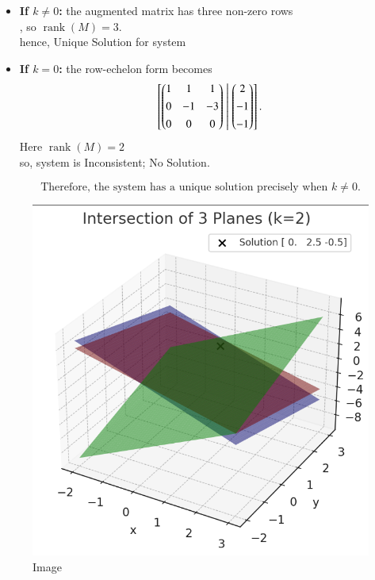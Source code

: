 \documentclass[journal]{IEEEtran}
\begin{document}
\begin{itemize}
\item \textbf{If \(k\neq0\):} the augmented matrix has three non-zero rows\\, so \(\operatorname{rank}(M)=3\).\\ 
hence, Unique Solution for system
\item \textbf{If \(k=0\):} the row-echelon form becomes
\[
\left[\begin{pmatrix}1 & 1 & 1\\[4pt] 0 & -1 & -3\\[4pt] 0 & 0 & 0\end{pmatrix}\;\middle|\;\begin{pmatrix}2\\[4pt]-1\\[4pt]-1\end{pmatrix}\right].
\]
Here \(\operatorname{rank}(M)=2\)\\
so, system is Inconsistent; No Solution.
\end{itemize}

\[
\boxed{\text{Therefore, the system has a unique solution precisely when }k\neq0.}
\]

\begin{figure}[H]
        \centering
        \includegraphics[width=0.75\linewidth]{figs/image.png}
        \caption{Image}
        \label{fig:placeholder}
\end{figure}
\end{document}
